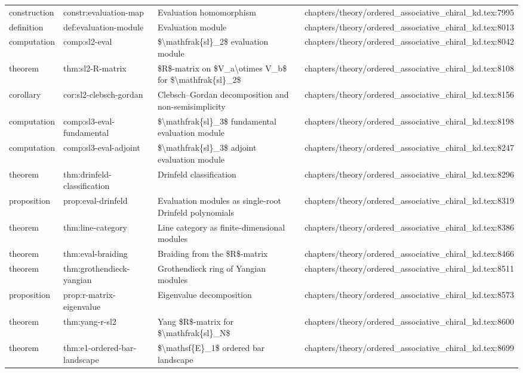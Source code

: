 \documentclass[11pt]{article}
\begin{document}
\begin{longtable}{L{0.10\textwidth}L{0.26\textwidth}L{0.42\textwidth}L{0.22\textwidth}}
construction & constr:evaluation-map & Evaluation homomorphism & chapters/theory/ordered\_associative\_chiral\_kd.tex:7995\\
definition & def:evaluation-module & Evaluation module & chapters/theory/ordered\_associative\_chiral\_kd.tex:8013\\
computation & comp:sl2-eval & \$\textbackslash{}mathfrak\{sl\}\_2\$ evaluation module & chapters/theory/ordered\_associative\_chiral\_kd.tex:8042\\
theorem & thm:sl2-R-matrix & \$R\$-matrix on \$V\_a\textbackslash{}otimes V\_b\$ for \$\textbackslash{}mathfrak\{sl\}\_2\$ & chapters/theory/ordered\_associative\_chiral\_kd.tex:8108\\
corollary & cor:sl2-clebsch-gordan & Clebsch--Gordan decomposition and non-semisimplicity & chapters/theory/ordered\_associative\_chiral\_kd.tex:8156\\
computation & comp:sl3-eval-fundamental & \$\textbackslash{}mathfrak\{sl\}\_3\$ fundamental evaluation module & chapters/theory/ordered\_associative\_chiral\_kd.tex:8198\\
computation & comp:sl3-eval-adjoint & \$\textbackslash{}mathfrak\{sl\}\_3\$ adjoint evaluation module & chapters/theory/ordered\_associative\_chiral\_kd.tex:8247\\
theorem & thm:drinfeld-classification & Drinfeld classification & chapters/theory/ordered\_associative\_chiral\_kd.tex:8296\\
proposition & prop:eval-drinfeld & Evaluation modules as single-root Drinfeld polynomials & chapters/theory/ordered\_associative\_chiral\_kd.tex:8319\\
theorem & thm:line-category & Line category as finite-dimensional modules & chapters/theory/ordered\_associative\_chiral\_kd.tex:8386\\
theorem & thm:eval-braiding & Braiding from the \$R\$-matrix & chapters/theory/ordered\_associative\_chiral\_kd.tex:8466\\
theorem & thm:grothendieck-yangian & Grothendieck ring of Yangian modules & chapters/theory/ordered\_associative\_chiral\_kd.tex:8511\\
proposition & prop:r-matrix-eigenvalue & Eigenvalue decomposition & chapters/theory/ordered\_associative\_chiral\_kd.tex:8573\\
theorem & thm:yang-r-sl2 & Yang \$R\$-matrix for \$\textbackslash{}mathfrak\{sl\}\_N\$ & chapters/theory/ordered\_associative\_chiral\_kd.tex:8600\\
theorem & thm:e1-ordered-bar-landscape & \$\textbackslash{}mathsf\{E\}\_1\$ ordered bar landscape & chapters/theory/ordered\_associative\_chiral\_kd.tex:8699\\

\end{longtable}
\end{document}

